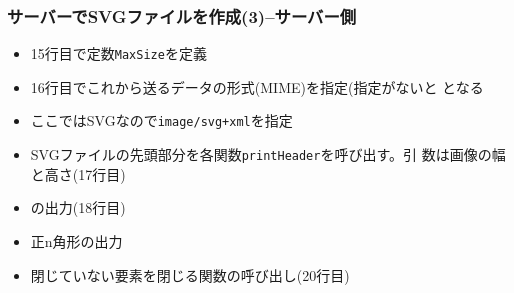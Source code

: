 \begin{frame}[containsverbatim]
 \frametitle{サーバーでSVGファイルを作成(3)--サーバー側}
 \begin{itemize}
	\item 15行目で定数\texttt{MaxSize}を定義
	\item 16行目でこれから送るデータの形式(MIME)を指定(指定がないと
				となる
	\item ここではSVGなので\texttt{image/svg+xml}を指定
	\item SVGファイルの先頭部分を各関数\texttt{printHeader}を呼び出す。引
				数は画像の幅と高さ(17行目)
	\item {}の出力(18行目)
	\item 正n角形の出力
	\item 閉じていない要素を閉じる関数の呼び出し(20行目)
 \end{itemize}
 \end{frame}
